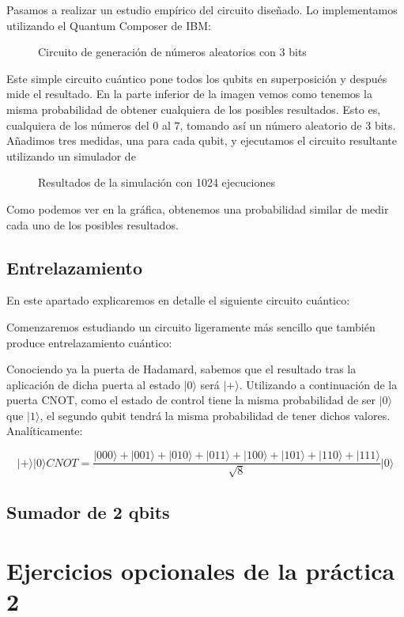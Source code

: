 \documentclass[11pt]{article}
\newcommand{\ra}{\rangle}
\begin{document}
Pasamos a realizar un estudio empírico del circuito diseñado. Lo implementamos utilizando el Quantum Composer de IBM:

\begin{figure}[H]
	\centering
	\caption{Circuito de generación de números aleatorios con 3 bits}
\end{figure}

Este simple circuito cuántico pone todos los qubits en superposición y después mide el resultado. En la parte inferior de la imagen vemos como tenemos la misma probabilidad de obtener cualquiera de los posibles resultados. Esto es, cualquiera de los números del $0$ al $7$, tomando así un número aleatorio de 3 bits. Añadimos tres medidas, una para cada qubit, y ejecutamos el circuito resultante utilizando un simulador de 

\begin{figure}[H]
	\centering
	\caption{Resultados de la simulación con 1024 ejecuciones}
\end{figure}

Como podemos ver en la gráfica, obtenemos una probabilidad similar de medir cada uno de los posibles resultados.

\subsection{Entrelazamiento}

En este apartado explicaremos en detalle el siguiente circuito cuántico:

\begin{figure}[H]
	\centering
\end{figure}

Comenzaremos estudiando un circuito ligeramente más sencillo que también produce entrelazamiento cuántico:

\begin{figure}[H]
	\centering
\end{figure}

Conociendo ya la puerta de Hadamard, sabemos que el resultado tras la aplicación de dicha puerta al estado $|0\ra$ será $|+\ra$. Utilizando a continuación de la puerta CNOT, como el estado de control tiene la misma probabilidad de ser $|0\ra$ que $|1\ra$, el segundo qubit tendrá la misma probabilidad de tener dichos valores. Analíticamente:

\[
	|+\ra|0\ra CNOT = \frac{|000\ra + |001\ra + |010\ra + |011\ra + |100\ra + |101\ra + |110\ra + |111\ra}{\sqrt 8} |0\ra
\]




\subsection{Sumador de 2 qbits}



\section{Ejercicios opcionales de la práctica 2}
\end{document}
